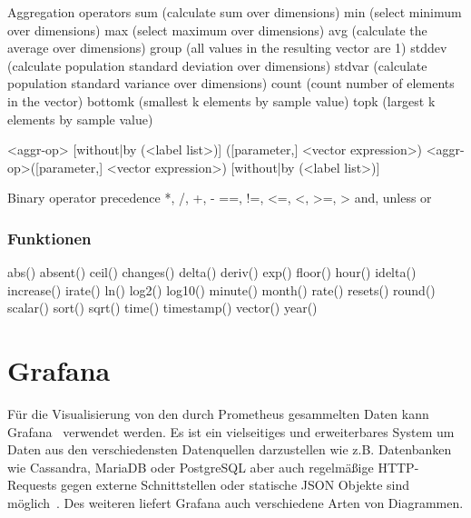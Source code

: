 Aggregation operators 
sum (calculate sum over dimensions)
min (select minimum over dimensions)
max (select maximum over dimensions)
avg (calculate the average over dimensions)
group (all values in the resulting vector are 1)
stddev (calculate population standard deviation over dimensions)
stdvar (calculate population standard variance over dimensions)
count (count number of elements in the vector)
bottomk (smallest k elements by sample value)
topk (largest k elements by sample value)

<aggr-op> [without|by (<label list>)] ([parameter,] <vector expression>)
<aggr-op>([parameter,] <vector expression>) [without|by (<label list>)]

Binary operator precedence 
*, /, %
+, -
==, !=, <=, <, >=, >
and, unless
or

\subsubsection{Funktionen}

abs()
absent()
ceil()
changes()
delta()
deriv()
exp()
floor()
hour()
idelta()
increase()
irate()
ln()
log2()
log10()
minute()
month()
rate()
resets()
round()
scalar()
sort()
sqrt()
time()
timestamp()
vector()
year()

\section{Grafana}
Für die Visualisierung von den durch Prometheus gesammelten Daten kann Grafana~\citep{GrafanaHomepage} verwendet werden. Es ist ein vielseitiges und erweiterbares System um Daten aus den verschiedensten Datenquellen darzustellen wie z.B. Datenbanken wie Cassandra, MariaDB oder PostgreSQL aber auch regelmäßige HTTP-Requests gegen externe Schnittstellen oder statische JSON Objekte sind möglich~\cite{GrafanaDataSources}. Des weiteren liefert Grafana auch verschiedene Arten von Diagrammen.

